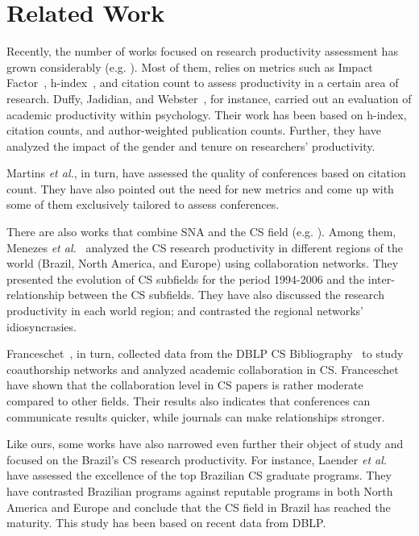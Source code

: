 \documentclass[10pt]{article}
\begin{document}

\section*{Related Work}
\label{sec:rw}


Recently, the number of works focused on research productivity assessment has grown considerably (e.g.
\cite{hirsch2005,bollen2006,garfield2006,mena-chalco2009,duffy2011,martins2010}
). Most of them, relies on metrics such as
 Impact Factor~\cite{garfield1955,garfield2006}, h-index~\cite{hirsch2005}, and
citation count to assess productivity in a certain area of research. Duffy, Jadidian, and Webster~\cite{duffy2011}, for
instance, carried out an evaluation of academic productivity within psychology. Their work has been based on h-index,
citation counts, and author-weighted publication counts. Further, they have analyzed the impact of the gender and tenure
on researchers' productivity. 

Martins \emph{et al.}\cite{martins2010}, in turn,  have assessed the quality of conferences based on citation count.
They have also pointed out the need for new metrics and come up with some of them exclusively tailored to assess
conferences.

There are also works that combine SNA and the CS field (e.g.
\cite{Menezes09ageographical,franceschet2010comparison,franceschet2011collaboration}). Among them, Menezes \emph{et
al.}~\cite{Menezes09ageographical} analyzed the CS research productivity in different regions of the world (Brazil,
North America, and Europe) using collaboration networks. They presented the evolution of CS subfields for the period
1994-2006 and the inter-relationship between the CS subfields. They have also discussed the research productivity in
each world region; and contrasted the regional networks' idiosyncrasies.

Franceschet~\cite{franceschet2011collaboration}, in turn, collected data from the DBLP CS Bibliography~\cite{ley2002} to
study coauthorship networks and analyzed academic collaboration in CS. Franceschet have shown that the collaboration
level in CS papers is rather moderate compared to other fields. Their results also indicates that conferences  can
communicate results quicker, while journals can make relationships stronger.

Like ours, some works have also narrowed even further their object of study and focused on the Brazil's CS research
productivity. 
For instance, Laender \emph{et al.}~\cite{laender2008} have assessed the excellence of the top Brazilian CS graduate
programs. They have contrasted Brazilian programs against reputable programs in both North America and Europe and
conclude that the CS field in Brazil has reached the maturity. This study has been based on recent data from
DBLP. 
\end{document}
